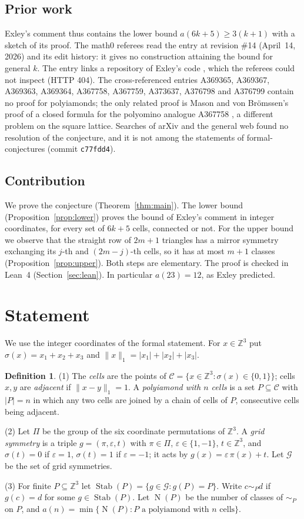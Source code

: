 \documentclass[11pt]{amsart}
\theoremstyle{plain}
\theoremstyle{definition}
\newtheorem{definition}[theorem]{Definition}
\newcommand{\Z}{\mathbb{Z}}
\newcommand{\C}{\mathcal{C}}
\newcommand{\G}{\mathcal{G}}
\newcommand{\Stab}{\operatorname{Stab}}
\newcommand{\cls}{\operatorname{N}}
\begin{document}
\subsection*{Prior work}
Exley's comment thus contains the lower bound $a(6k+5)\ge3(k+1)$ with a sketch of its proof. The math0 referees read the entry at revision \#14 (April~14, 2026) and its edit history: it gives no construction attaining the bound for general $k$. The entry links a repository of Exley's code \cite{Exley}, which the referees could not inspect (HTTP 404). The cross-referenced entries A369365, A369367, A369363, A369364, A367758, A367759, A373637, A376798 and A376799 contain no proof for polyiamonds; the only related proof is Mason and von Brömssen's proof of a closed formula for the polyomino analogue A367758 \cite{MvB}, a different problem on the square lattice. Searches of arXiv and the general web found no resolution of the conjecture, and it is not among the statements of formal-conjectures \cite{FC} (commit \texttt{c77fdd4}).

\subsection*{Contribution}
We prove the conjecture (Theorem~\ref{thm:main}). The lower bound (Proposition~\ref{prop:lower}) proves the bound of Exley's comment in integer coordinates, for every set of $6k+5$ cells, connected or not. For the upper bound we observe that the straight row of $2m+1$ triangles has a mirror symmetry exchanging its $j$-th and $(2m-j)$-th cells, so it has at most $m+1$ classes (Proposition~\ref{prop:upper}). Both steps are elementary. The proof is checked in Lean~4 (Section~\ref{sec:lean}). In particular $a(23)=12$, as Exley predicted.

\section{Statement}\label{sec:statement}

We use the integer coordinates of the formal statement. For $x\in\Z^3$ put $\sigma(x)=x_1+x_2+x_3$ and $\|x\|_1=|x_1|+|x_2|+|x_3|$.

\begin{definition}\label{def:main}
(1) The \emph{cells} are the points of $\C=\{x\in\Z^3:\sigma(x)\in\{0,1\}\}$; cells $x,y$ are \emph{adjacent} if $\|x-y\|_1=1$. A \emph{polyiamond with $n$ cells} is a set $P\subseteq\C$ with $|P|=n$ in which any two cells are joined by a chain of cells of $P$, consecutive cells being adjacent.

(2) Let $\Pi$ be the group of the six coordinate permutations of $\Z^3$. A \emph{grid symmetry} is a triple $g=(\pi,\varepsilon,t)$ with $\pi\in\Pi$, $\varepsilon\in\{1,-1\}$, $t\in\Z^3$, and $\sigma(t)=0$ if $\varepsilon=1$, $\sigma(t)=1$ if $\varepsilon=-1$; it acts by $g(x)=\varepsilon\,\pi(x)+t$. Let $\G$ be the set of grid symmetries.

(3) For finite $P\subseteq\Z^3$ let $\Stab(P)=\{g\in\G: g(P)=P\}$. Write $c\sim_P d$ if $g(c)=d$ for some $g\in\Stab(P)$. Let $\cls(P)$ be the number of classes of $\sim_P$ on $P$, and $a(n)=\min\{\cls(P): P\text{ a polyiamond with $n$ cells}\}$.
\end{definition}
\end{document}
